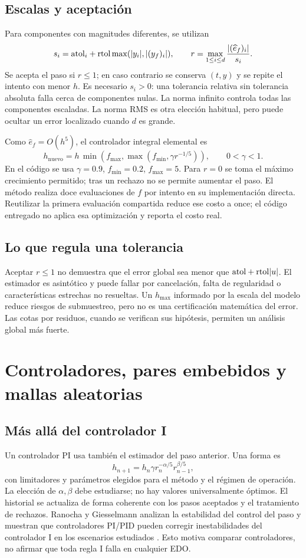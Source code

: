 \documentclass[11pt,a4paper]{article}
\theoremstyle{definition}\newtheorem{definition}[theorem]{Definición}
\theoremstyle{remark}\newtheorem{remark}[theorem]{Observación}
\newcommand{\rtol}{\mathrm{rtol}}
\begin{document}
\subsection{Escalas y aceptación}
Para componentes con magnitudes diferentes, se utilizan
\[
 s_i=\atol_i+\rtol\max(|y_i|,|(y_f)_i|),\qquad
 r=\max_{1\leq i\leq d}\frac{|(\widehat e_f)_i|}{s_i}.
\]
Se acepta el paso si $r\leq1$; en caso contrario se conserva $(t,y)$ y se
repite el intento con menor $h$. Es necesario $s_i>0$: una tolerancia relativa
sin tolerancia absoluta falla cerca de componentes nulas. La norma infinito
controla todas las componentes escaladas. La norma RMS es otra elección
habitual, pero puede ocultar un error localizado cuando $d$ es grande.

Como $\widehat e_f=O(h^5)$, el controlador integral elemental es
\begin{equation}\label{eq:controller}
h_{\mathrm{nuevo}}=h\,\min\!\left(f_{\max},\max\!\left(f_{\min},
 \gamma r^{-1/5}\right)\right),\qquad 0<\gamma<1.
\end{equation}
En el código se usa $\gamma=0.9$, $f_{\min}=0.2$, $f_{\max}=5$.
Para $r=0$ se toma el máximo crecimiento permitido; tras un rechazo no se
permite aumentar el paso. El método realiza doce evaluaciones de $f$ por
intento en su implementación directa. Reutilizar la primera evaluación
compartida reduce ese costo a once; el código entregado no aplica esa
optimización y reporta el costo real.

\subsection{Lo que regula una tolerancia}
Aceptar $r\leq1$ no demuestra que el error global sea menor que
$\atol+\rtol|u|$. El estimador es asintótico y puede fallar por cancelación,
falta de regularidad o características estrechas no resueltas. Un $h_{\max}$
informado por la escala del modelo reduce riesgos de submuestreo, pero no
es una certificación matemática del error. Las cotas por residuos, cuando
se verifican sus hipótesis, permiten un análisis global más fuerte.

\clearpage
\section{Controladores, pares embebidos y mallas aleatorias}
\subsection{Más allá del controlador I}
Un controlador PI usa también el estimador del paso anterior. Una forma es
\[
h_{n+1}=h_n\gamma r_n^{-\alpha/5}r_{n-1}^{\beta/5},
\]
con limitadores y parámetros elegidos para el método y el régimen de
operación. La elección de $\alpha,\beta$ debe estudiarse; no hay valores
universalmente óptimos. El historial se actualiza de forma coherente con
los pasos aceptados y el tratamiento de rechazos. Ranocha y Giesselmann
analizan la estabilidad del control del paso y muestran que controladores
PI/PID pueden corregir inestabilidades del controlador I en los escenarios
estudiados \cite{ranocha2024}. Esto motiva comparar controladores, no afirmar
que toda regla I falla en cualquier EDO.
\end{document}
